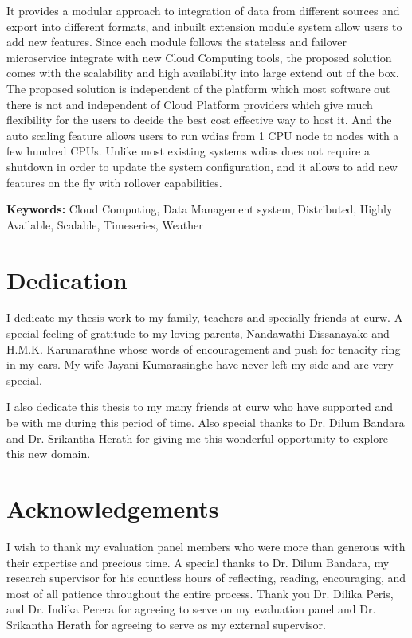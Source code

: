 \documentclass[a4paper,oneside,12pt]{report}
\begin{document}
{It provides a modular approach to integration of data from different sources and export into different formats, and inbuilt extension module system allow users to add new features. Since each module follows the stateless and failover microservice integrate with new Cloud Computing tools, the proposed solution comes with the scalability and high availability into large extend out of the box. The proposed solution is independent of the platform which most software out there is not and independent of Cloud Platform providers which give much flexibility for the users to decide the best cost effective way to host it. And the auto scaling feature allows users to run \acrshort{wdias} from 1 CPU node to nodes with a few hundred CPUs. Unlike most existing systems \acrshort{wdias} does not require a shutdown in order to update the system configuration, and it allows to add new features on the fly with rollover capabilities.

\vspace{4mm}

\textbf{Keywords:} Cloud Computing, Data Management system, Distributed,  Highly Available, Scalable, Timeseries, Weather
}
\restoregeometry
\normalsize

\chapter*{Dedication}
I dedicate my thesis work to my family, teachers and specially friends at \acrfull{curw}. A special feeling of gratitude to my loving parents, Nandawathi Dissanayake and H.M.K. Karunarathne whose words of encouragement and push for tenacity ring in my ears. My wife Jayani Kumarasinghe have never left my side and are very special.

I also dedicate this thesis to my many friends at \acrshort{curw} who have supported and be with me during this period of time. Also special thanks to Dr. Dilum Bandara and Dr. Srikantha Herath for giving me this wonderful opportunity to explore this new domain.

\chapter*{Acknowledgements}
I wish to thank my evaluation panel members who were more than generous with their expertise and precious time. A special thanks to Dr. Dilum Bandara, my research supervisor for his countless hours of reflecting, reading, encouraging, and most of all patience throughout the entire process. Thank you Dr. Dilika Peris, and Dr. Indika Perera for agreeing to serve on my evaluation panel and Dr. Srikantha Herath for agreeing to serve as my external supervisor.
\end{document}
